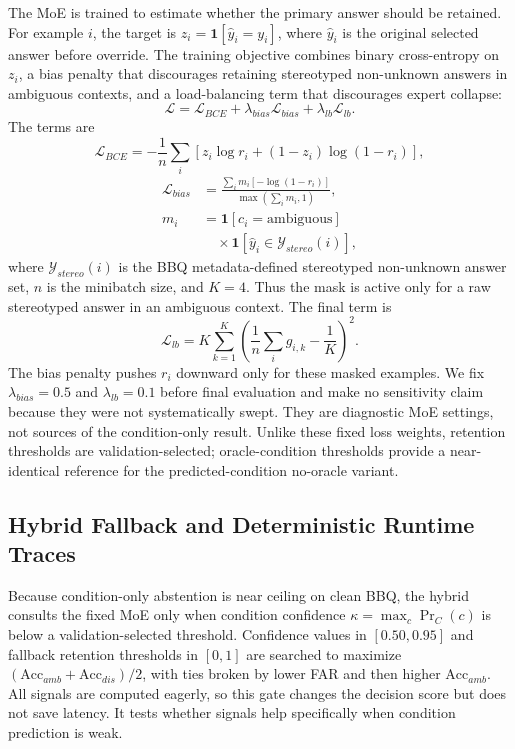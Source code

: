 \documentclass{ieeeaccess}
\newcommand{\accamb}{\mathrm{Acc}_{amb}}
\newcommand{\accdis}{\mathrm{Acc}_{dis}}
\begin{document}
The MoE is trained to estimate whether the primary answer should be retained. For example $i$, the target is $z_i=\mathbf{1}[\hat{y}_i=y_i]$, where $\hat{y}_i$ is the original selected answer before override. The training objective combines binary cross-entropy on $z_i$, a bias penalty that discourages retaining stereotyped non-unknown answers in ambiguous contexts, and a load-balancing term that discourages expert collapse:
\begin{equation}
    \mathcal{L}=\mathcal{L}_{BCE}+\lambda_{bias}\mathcal{L}_{bias}+\lambda_{lb}\mathcal{L}_{lb}.
\end{equation}
The terms are
\begin{equation}
    \mathcal{L}_{BCE}=-\frac{1}{n}\sum_i\left[z_i\log r_i+(1-z_i)\log(1-r_i)\right],
\end{equation}
\begin{equation}
\label{eq:bias_penalty}
\begin{aligned}
    \mathcal{L}_{bias}
    &=\frac{\sum_i m_i[-\log(1-r_i)]}{\max\!\left(\sum_i m_i,1\right)},\\
    m_i
    &=\mathbf{1}[c_i=\mathrm{ambiguous}]\\
    &\quad{}\times
      \mathbf{1}[\hat{y}_i\in\mathcal{Y}_{stereo}(i)],
\end{aligned}
\end{equation}
where $\mathcal{Y}_{stereo}(i)$ is the BBQ metadata-defined stereotyped non-unknown answer set, $n$ is the minibatch size, and $K=4$. Thus the mask is active only for a raw stereotyped answer in an ambiguous context. The final term is
\begin{equation}
    \mathcal{L}_{lb}=K\sum_{k=1}^{K}\left(\frac{1}{n}\sum_i g_{i,k}-\frac{1}{K}\right)^2.
\end{equation}
The bias penalty pushes $r_i$ downward only for these masked examples. We fix $\lambda_{bias}=0.5$ and $\lambda_{lb}=0.1$ before final evaluation and make no sensitivity claim because they were not systematically swept. They are diagnostic MoE settings, not sources of the condition-only result. Unlike these fixed loss weights, retention thresholds are validation-selected; oracle-condition thresholds provide a near-identical reference for the predicted-condition no-oracle variant.

\subsection{Hybrid Fallback and Deterministic Runtime Traces}
Because condition-only abstention is near ceiling on clean BBQ, the hybrid consults the fixed MoE only when condition confidence $\kappa=\max_c\Pr_C(c)$ is below a validation-selected threshold. Confidence values in $[0.50,0.95]$ and fallback retention thresholds in $[0,1]$ are searched to maximize $(\accamb+\accdis)/2$, with ties broken by lower FAR and then higher $\accamb$. All signals are computed eagerly, so this gate changes the decision score but does not save latency. It tests whether signals help specifically when condition prediction is weak.
\end{document}
